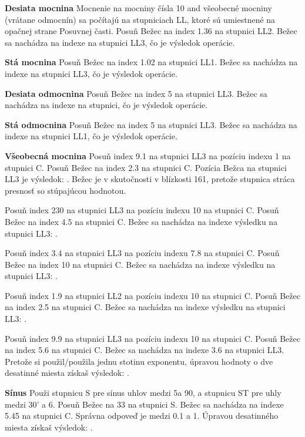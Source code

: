 \begin{multicols*}{3}
{  \textbf{Desiata mocnina}
\footnotesize Mocnenie na mocniny čísla 10 and všeobecné mocniny (vrátane odmocnín) sa počítajú na stupniciach LL, ktoré sú umiestnené na opačnej strane Posuvnej časti. \normalsize
Posuň Bežec na index 1.36 na stupnici LL2.
Bežec sa nachádza na indexe  na stupnici LL3, čo je výsledok operácie.

  \textbf{Stá mocnina}
Posuň Bežec na index 1.02 na stupnici LL1.
Bežec sa nachádza na indexe  na stupnici LL3, čo je výsledok operácie.

  \textbf{Desiata odmocnina}
Posuň Bežec na index 5 na stupnici LL3.
Bežec sa nachádza na indexe  na stupnici, čo je výsledok operácie.

  \textbf{Stá odmocnina}
Posuň Bežec na index 5 na stupnici LL3.
Bežec sa nachádza na indexe  na stupnici LL1, čo je výsledok operácie.

  \textbf{Všeobecná mocnina}
Posuň index 9.1 na stupnici LL3 na pozíciu indexu 1 na stupnici C.
Posuň Bežec na index 2.3 na stupnici C.
Pozícia Bežca na stupnici LL3 je výsledok: . Bežec je v skutočnosti v blízkosti 161, pretože stupnica stráca presnosť so stúpajúcou hodnotou. 

Posuň index 230 na stupnici LL3 na pozíciu indexu 10 na stupnici C.
Posuň Bežec na index 4.5 na stupnici C.
Bežec sa nachádza na indexe výsledku na stupnici LL3: .

Posuň index 3.4 na stupnici LL3 na pozíciu indexu 7.8 na stupnici C.
Posuň Bežec na index 10 na stupnici C.
Bežec sa nachádza na indexe výsledku na stupnici LL3: .

Posuň index 1.9 na stupnici LL2 na pozíciu indexu 10 na stupnici C.
Posuň Bežec na index 2.5 na stupnici C.
Bežec sa nachádza na indexe výsledku na stupnici LL3: .

Posuň index 9.9 na stupnici LL3 na pozíciu indexu 10 na stupnici C.
Posuň Bežec na index 5.6 na stupnici C.
Bežec sa nachádza na indexe 3.6 na stupnici LL3.
Pretože si použil/použila jednu stotinu exponentu, úpravou hodnoty o dve desatinné miesta získaš výsledok: .

  \textbf{Sínus}
\footnotesize Použi stupnicu S pre sínus uhlov medzi 5\textdegree a 90\textdegree, a stupnicu ST pre uhly medzi 30' a 6\textdegree. \normalsize
{}
Posuň Bežec na 33 na stupnici S.
Bežec sa nachádza na indexe 5.45 na stupnici C.
Správna odpoveď je medzi 0.1 a 1. Úpravou desatinného miesta získaš výsledok: .

}
\end{multicols*}
